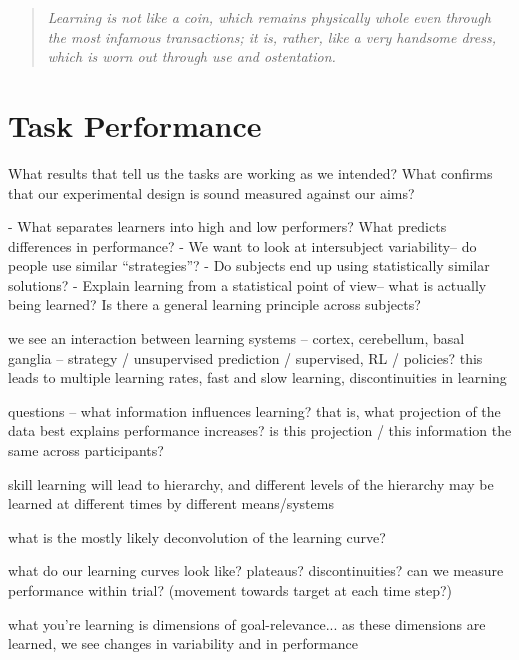 \documentclass[../main.tex]{subfiles}
\begin{document}
\begin{quote}
    \emph{Learning is not like a coin, which remains physically whole even through the most infamous transactions; it is, rather, like a very handsome dress, which is worn out through use and ostentation.}
\end{quote}


\cleardoublepage%









\section{Task Performance}

What results that tell us the tasks are working as we intended? What confirms that our experimental design is sound measured against our aims?
 
- What separates learners into high and low performers? What predicts differences in performance?
- We want to look at intersubject variability– do people use similar “strategies”?
- Do subjects end up using statistically similar solutions?
- Explain learning from a statistical point of view– what is actually being learned? Is there a general learning principle across subjects?


we see an interaction between learning systems -- cortex, cerebellum, basal ganglia -- strategy / unsupervised prediction / supervised, RL / policies?
this leads to multiple learning rates, fast and slow learning, discontinuities in learning

questions -- what information influences learning?
that is, what projection of the data best explains performance increases?
is this projection / this information the same across participants?

skill learning will lead to hierarchy, and different levels of the hierarchy may be learned at different times by different means/systems

what is the mostly likely deconvolution of the learning curve?

what do our learning curves look like? plateaus? discontinuities?
can we measure performance within trial? (movement towards target at each time step?)

what you're learning is dimensions of goal-relevance... as these dimensions are learned, we see changes in variability and in performance
\end{document}

